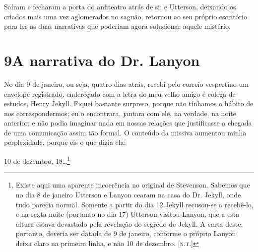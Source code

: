 Saíram e fecharam a porta do anfiteatro atrás de si; e Utterson,
deixando os criados mais uma vez aglomerados no saguão, retornou ao seu
próprio escritório para ler as duas narrativas que poderiam agora
solucionar aquele mistério.


\chapter[9 -- A narrativa do Dr. Lanyon]{9\break A narrativa do Dr. Lanyon}

No dia 9 de janeiro, ou seja, quatro dias atrás, recebi pelo correio
vespertino um envelope registrado, endereçado com a letra do meu velho
amigo e colega de estudos, Henry Jekyll.  Fiquei bastante surpreso,
porque não tínhamos o hábito de nos correspondermos; eu o encontrara,
jantara com ele, na verdade, na noite anterior; e não podia imaginar
nada em nossas relações que justificasse a chegada de uma comunicação
assim tão formal.  O conteúdo da missiva aumentou minha perplexidade,
porque eis o que dizia ela:

10 de dezembro, 18\ldots{}\footnote{ Existe aqui uma aparente incoerência no original de Stevenson.  Sabemos
que no dia 8 de janeiro Utterson e Lanyon cearam na casa do Dr. Jekyll,
onde tudo parecia normal.  Somente a partir do dia 12 Jekyll recusou-se
a recebê-lo, e na sexta noite (portanto no dia 17) Utterson visitou
Lanyon, que a esta altura estava devastado pela revelação do segredo
de Jekyll.  A carta deste, portanto, deveria ser datada de 9
de janeiro, conforme o próprio Lanyon deixa claro na primeira linha, e
não 10 de dezembro. [\textsc{n.t.}]}

